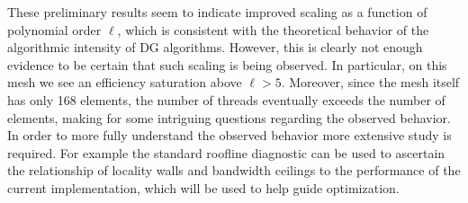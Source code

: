These preliminary results seem to indicate improved scaling as a function of polynomial order $\ell$, which is consistent with the theoretical
behavior of the algorithmic intensity of DG algorithms.  However, this is
clearly not enough evidence to be certain that such scaling is being observed.
In particular, on this mesh we see an efficiency saturation above $\ell>5$.
Moreover, since the mesh itself has only 168 elements, the number of threads
eventually exceeds the number of elements, making for some intriguing questions
regarding the observed behavior.  In order to more fully understand the observed behavior more extensive study is required. For example the standard roofline diagnostic \cite{Williams:2009:RIV:1498765.1498785} can be used to ascertain the relationship of locality walls and bandwidth ceilings to the performance of the current implementation, which will be used to help guide optimization.   


%
%
%




